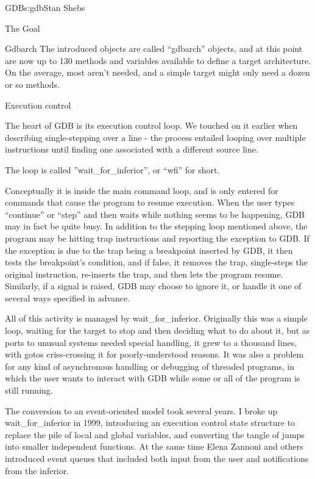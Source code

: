 \begin{aosachapter}{GDB}{s:gdb}{Stan Shebs}
\begin{aosasect1}{The Goal}
\begin{aosasect1}{Gdbarch}
The introduced objects are called ``gdbarch'' objects, and at this
point are now up to 130 methods and variables available to define a
target architecture.  On the average, most aren't needed, and a
simple target might only need a dozen or so methods.

\end{aosasect1}

\begin{aosasect1}{Execution control}

The heart of GDB is its execution control loop.  We touched on it earlier
when describing single-stepping over a line - the process entailed looping
over multiple instructions until finding one associated with a different
source line.

The loop is called ''wait\_for\_inferior'', or ``wfi'' for short.

Conceptually it is inside the main command loop, and is only entered for
commands that cause the program to resume execution.  When the user types
``continue'' or ``step'' and then waits while nothing seems to be happening,
GDB may in fact be quite busy.  In addition to the stepping loop mentioned
above, the program may be hitting trap instructions and reporting the exception
to GDB.  If the exception is due to the trap being a breakpoint inserted by
GDB, it then tests the breakpoint's condition, and if false, it removes the
trap, single-steps the original instruction, re-inserts the trap, and then
lets the program resume.  Similarly, if a signal is raised, GDB may choose
to ignore it, or handle it one of several ways specified in advance.

All of this activity is managed by wait\_for\_inferior.  Originally this
was a simple loop, waiting for the target to stop and then deciding
what to do about it, but as ports to unusual systems needed special
handling, it grew to a thousand lines, with gotos criss-crossing it
for poorly-understood reasons.  It was also a problem for any kind of
asynchronous handling or debugging of threaded programs, in which the
user wants to interact with GDB while some or all of the program is
still running.

The conversion to an event-oriented model took several years.  I broke
up wait\_for\_inferior in 1999, introducing an execution control state
structure to replace the pile of local and global variables, and
converting the tangle of jumps into smaller independent functions.  At
the same time Elena Zannoni and others introduced event queues that
included both input from the user and notifications from the inferior.


\end{aosasect1}
\end{aosasect1}
\end{aosachapter}

